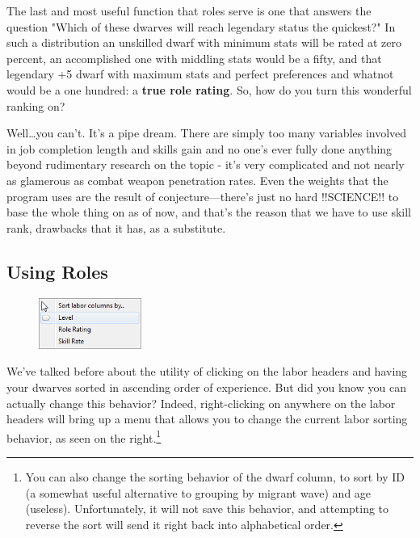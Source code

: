 \documentclass[]{article}
\begin{document}
The last and most useful function that roles serve is one that answers the question "Which of these
dwarves will reach legendary status the quickest?" In such a distribution an unskilled dwarf with minimum
stats will be rated at zero percent, an accomplished one with middling stats would be a fifty, and that
legendary +5 dwarf with maximum stats and perfect preferences and whatnot would be a one hundred: a
\textbf{true role rating}. So, how do you turn this wonderful ranking on?

Well\ldots you can't. It's a pipe dream. There are simply too many variables involved in job completion
length and skills gain and no one's ever fully done anything beyond rudimentary research on the topic -
it's very complicated and not nearly as glamerous as combat weapon penetration rates. Even the weights
that the program uses are the result of conjecture---there's just no hard !!SCIENCE!! to base the whole
thing on as of now, and that's the reason that we have to use skill rank, drawbacks that it has, as a
substitute.

\subsection{Using Roles}
\label{sec:Using Roles}

\begin{figure}\vspace{-22pt}
  \begin{center}
    \includegraphics[width=0.3\textwidth]{Sec3Fig2}
  \end{center}
\vspace{-15pt}
\end{figure}
We've talked before about the utility of clicking on the labor headers and having your dwarves sorted in
ascending order of experience. But did you know you can actually change this behavior? Indeed,
right-clicking on anywhere on the labor headers will bring up a menu that allows you to change the
current labor sorting behavior, as seen on the right.\footnote{You can also change the sorting behavior
of the dwarf column, to sort by ID (a somewhat useful alternative to grouping by migrant wave) and age
(useless). Unfortunately, it will not save this behavior, and attempting to reverse the sort will send it
right back into alphabetical order.}
\end{document}
